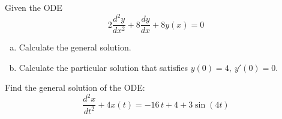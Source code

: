 \documentclass[10pt,twoside,sfsidenotes]{tufte-handout}
\begin{document}
\begin{question}
  Given the ODE 
  \[
    2\frac{d^{2}y}{dx^{2}} + 8 \frac{dy}{dx} + 8 y(x) = 0
  \]
  \begin{enumerate}[(a)]
    \item Calculate the general solution.
    
    \vfill

    \item Calculate the particular solution that satisfies \(y(0) = 4,\ y'(0) = 0\).

    \vfill
  \end{enumerate}
\end{question}

\clearpage
\begin{question}
    Find the general solution of the ODE: 
    \[
      \frac{d^{2}x}{dt^{2}} + 4x(t) = -16\,t + 4 +3 \sin(4t)
    \]
\end{question}
\end{document}
